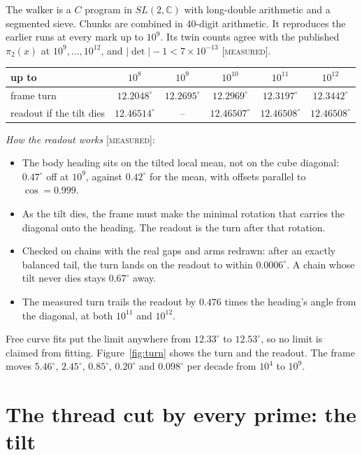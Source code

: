 \documentclass[11pt]{article}
\theoremstyle{definition}
\theoremstyle{remark}
\newcommand{\grade}[1]{\textsc{[#1]}}
\begin{document}
The walker is a $C$ program in $SL(2,\mathbb C)$ with long-double arithmetic and a segmented sieve. Chunks are combined in 40-digit arithmetic. It reproduces the earlier runs at every mark up to $10^9$. Its twin counts agree with the published $\pi_2(x)$ at $10^9,\dots,10^{12}$, and $|\det|-1<7\times10^{-13}$ \grade{measured}.

\begin{center}
\begin{tabular}{lccccc}
\toprule
up to & $10^8$ & $10^9$ & $10^{10}$ & $10^{11}$ & $10^{12}$\\
\midrule
frame turn & $12.2048^\circ$ & $12.2695^\circ$ & $12.2969^\circ$ & $12.3197^\circ$ & $12.3442^\circ$\\
readout if the tilt dies & $12.46514^\circ$ & -- & $12.46507^\circ$ & $12.46508^\circ$ & $12.46508^\circ$\\
\bottomrule
\end{tabular}
\end{center}

\noindent\emph{How the readout works} \grade{measured}:
\begin{itemize}
\item The body heading sits on the tilted local mean, not on the cube diagonal: $0.47^\circ$ off at $10^9$, against $0.42^\circ$ for the mean, with offsets parallel to $\cos=0.999$.
\item As the tilt dies, the frame must make the minimal rotation that carries the diagonal onto the heading. The readout is the turn after that rotation.
\item Checked on chains with the real gaps and arms redrawn: after an exactly balanced tail, the turn lands on the readout to within $0.0006^\circ$. A chain whose tilt never dies stays $0.67^\circ$ away.
\item The measured turn trails the readout by $0.476$ times the heading's angle from the diagonal, at both $10^{11}$ and $10^{12}$.
\end{itemize}
Free curve fits put the limit anywhere from $12.33^\circ$ to $12.53^\circ$, so no limit is claimed from fitting. Figure~\ref{fig:turn} shows the turn and the readout. The frame moves $5.46^\circ$, $2.45^\circ$, $0.85^\circ$, $0.20^\circ$ and $0.098^\circ$ per decade from $10^4$ to $10^9$.

\section{The thread cut by every prime: the tilt}\label{sec:thread}
\end{document}
